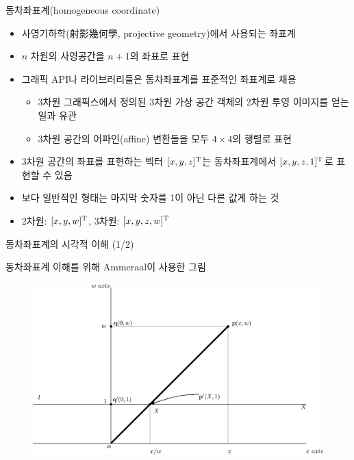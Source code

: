 \begin{frame}{동차좌표계(homogeneous coordinate)}

\begin{itemize}
\item 사영기하학(射影幾何學, projective geometry)에서 사용되는 좌표계
\item $n$ 차원의 사영공간을 $n+1$의 좌표로 표현
\item 그래픽 API나 라이브러리들은 동차좌표계를 표준적인 좌표계로 채용
	\begin{itemize}
	\item 3차원 그래픽스에서 정의된 3차원 가상 공간 객체의 2차원 투영 이미지를 얻는 일과 유관
	\item 3차원 공간의 어파인(affine) 변환들을 모두 $4 \times 4$의 행렬로 표현
	\end{itemize}
\item 3차원 공간의 좌표를 표현하는 벡터 $[x,y,z]^{\rm T}$는 동차좌표계에서 $[x,y,z,1]^{\rm T}$로 표현할 수 있음
\item 보다 일반적인 형태는 마지막 숫자를 1이 아닌 다른 값게 하는 것
\item 2차원: $[x,y,w]^{\rm T}$, 3차원: $[x,y,z,w]^{\rm T}$
\end{itemize}

\end{frame}


\begin{frame}{동차좌표계의 시각적 이해 (1/2)}

동차좌표계 이해를 위해 Ammeraal이 사용한 그림

\begin{figure}
    \includegraphics[width=12cm]{Math_transform/homogeneousConcept.eps}
\end{figure}

\end{frame}



